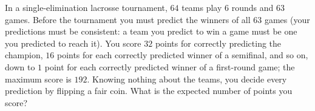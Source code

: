 In a single-elimination lacrosse tournament, $64$ teams play $6$ rounds and $63$ games. Before the tournament you must predict the winners of all $63$ games (your predictions must be consistent: a team you predict to win a game must be one you predicted to reach it). You score $32$ points for correctly predicting the champion, $16$ points for each correctly predicted winner of a semifinal, and so on, down to $1$ point for each correctly predicted winner of a first-round game; the maximum score is $192$. Knowing nothing about the teams, you decide every prediction by flipping a fair coin. What is the expected number of points you score?
